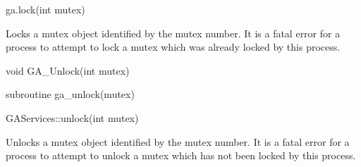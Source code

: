 \documentclass[10pt]{article}
\begin{document}
\begin{pyapi}
\begin{pycode}
ga.lock(int mutex)
\end{pycode}
\end{pyapi}

\ncoll

\begin{desc}

Locks a mutex object identified by the mutex number. It is a fatal error for a
process to attempt to lock a mutex which was already locked by this process.

\end{desc}



\begin{capi}
\begin{ccode}
void GA_Unlock(int mutex)
\end{ccode}
\begin{funcargs}
\end{funcargs}
\end{capi}

\begin{fapi}
\begin{fcode}
subroutine ga_unlock(mutex)
\end{fcode}
\begin{funcargs}
\end{funcargs}
\end{fapi}

\begin{cxxapi}
\begin{cxxcode}
GAServices::unlock(int mutex)
\end{cxxcode}
\begin{funcargs}
\end{funcargs}
\end{cxxapi}

\ncoll

\begin{desc}

Unlocks a mutex object identified by the mutex number. It is a fatal error for
a process to attempt to unlock a mutex which has not been locked by this
process.

\end{desc}

\end{document}
